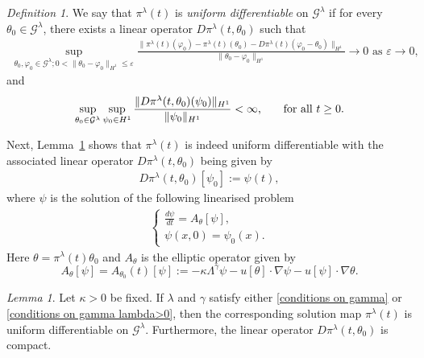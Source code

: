 \documentclass[reqno]{amsart}%
\theoremstyle{definition}
\theoremstyle{remark}
\numberwithin{equation}{section}
\newtheorem{definition}[theorem]{Definition}
\newtheorem{lemma}[theorem]{Lemma}
\newcommand{\dis}{\displaystyle}
\newcommand{\1}{\mathbf{1}}
\newcommand{\Gg}{\mathcal{G}^{\lambda}}
\newcommand{\pin}{\pi^{\lambda}}
\numberwithin{equation}{section}
\numberwithin{theorem}{section}
\numberwithin{figure}{section}
\begin{document}
\begin{definition}\label{uniform differentiable def}
We say that $\pin(t)$ is {\it uniform differentiable} on $\Gg$ if for every $\theta_0\in\Gg$, there exists a linear operator $D\pin(t, \theta_0)$ such that
\begin{align}\label{condition 1 for uniform differentiable}
\mbox{$\dis\sup_{\theta_0,\varphi_0\in\Gg;0<\|\theta_0-\varphi_0\|_{H^1}\le\varepsilon}\frac{\|\pin(t)(\varphi_0)-\pin(t)(\theta_0)-D\pin(t)(\varphi_0-\theta_0)\|_{H^1}}{\|\theta_0-\varphi_0\|_{H^1}}\to0$ as $\varepsilon\to0$,}
\end{align}
and 
\begin{align}\label{condition 2 for uniform differentiable}
\mbox{$\dis\sup_{\theta_0\in\Gg}\sup_{\psi_0\in H^1}\frac{\|D\pin(t,\theta_0)(\psi_0)\|_{H^1}}{\|\psi_0\|_{H^1}}<\infty$,\qquad for all $t\ge0$.}
\end{align}
\end{definition}
Next, Lemma~\ref{uniform differentiable lemma} shows that $\pin(t)$ is indeed uniform differentiable with the associated linear operator $D\pin(t, \theta_0)$ being given by 
\begin{align*}
D\pin(t, \theta_0)[\psi_0]:=\psi(t),
\end{align*}
where $\psi$ is the solution of the following linearised problem
\begin{align}\label{linearised active scalar with gamma}
\left\{ \begin{array}{l}
\frac{d\psi}{dt}=A_{\theta}[\psi], \\
\psi(x,0)=\psi_0(x).
\end{array}\right.
\end{align}
Here $\theta=\pin(t)\theta_0$ and $A_{\theta}$ is the elliptic operator given by
\begin{equation}\label{def of operator A theta}
A_{\theta}[\psi]=A_{\theta_0}(t)[\psi]:=-\kappa\Lambda^\gamma\psi-u[\theta]\cdot\nabla\psi-u[\psi]\cdot\nabla\theta.
\end{equation}
\begin{lemma}\label{uniform differentiable lemma}
Let $\kappa>0$ be fixed. If $\lambda$ and $\gamma$ satisfy either \eqref{conditions on gamma} or \eqref{conditions on gamma lambda>0}, then the corresponding solution map $\pin(t)$ is uniform differentiable on $\Gg$. Furthermore, the linear operator $D\pin(t, \theta_0)$ is compact.
\end{lemma}
\end{document}
